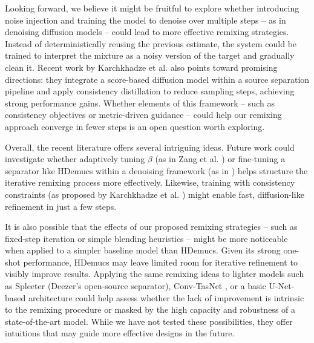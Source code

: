 \documentclass{article}
\begin{document}
\begin{sloppy}
Looking forward, we believe it might be fruitful to explore whether introducing noise injection and training the model to denoise over multiple steps – as in denoising diffusion models \cite{Plaja-Roglans_2022} – could lead to more effective remixing strategies. Instead of deterministically reusing the previous estimate, the system could be trained to interpret the mixture as a noisy version of the target and gradually clean it. Recent work by Karchkhadze et al. \cite{Karchkhadze2024Improving} also points toward promising directions: they integrate a score-based diffusion model within a source separation pipeline and apply consistency distillation to reduce sampling steps, achieving strong performance gains. Whether elements of this framework – such as consistency objectives or metric-driven guidance – could help our remixing approach converge in fewer steps is an open question worth exploring.

Overall, the recent literature offers several intriguing ideas. Future work could investigate whether adaptively tuning $\beta$ (as in Zang et al. \cite{Zang}) or fine-tuning a separator like HDemucs within a denoising framework (as in \cite{Plaja-Roglans_2022}) helps structure the iterative remixing process more effectively. Likewise, training with consistency constraints (as proposed by Karchkhadze et al. \cite{Karchkhadze2024Improving}) might enable fast, diffusion-like refinement in just a few steps.

It is also possible that the effects of our proposed remixing strategies – such as fixed-step iteration or simple blending heuristics – might be more noticeable when applied to a simpler baseline model than HDemucs. Given its strong one-shot performance, HDemucs may leave limited room for iterative refinement to visibly improve results. Applying the same remixing ideas to lighter models such as Spleeter \cite{Hennequin2020Spleeter} (Deezer’s open-source separator), Conv-TasNet \cite{Luo2019ConvTasNet}, or a basic U-Net-based architecture could help assess whether the lack of improvement is intrinsic to the remixing procedure or masked by the high capacity and robustness of a state-of-the-art model.
While we have not tested these possibilities, they offer intuitions that may guide more effective designs in the future.





\end{sloppy}
\end{document}
